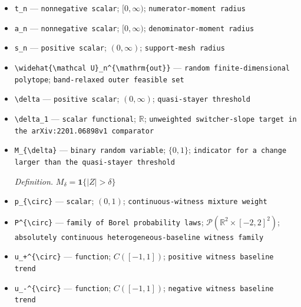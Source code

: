 \documentclass{article}
\begin{document}
\begin{itemize}
  \item \texttt{t\_\allowbreak{}n} --- \texttt{nonnegative scalar}; \([0,\infty)\); \texttt{numerator-\allowbreak{}moment radius}
  \item \texttt{a\_\allowbreak{}n} --- \texttt{nonnegative scalar}; \([0,\infty)\); \texttt{denominator-\allowbreak{}moment radius}
  \item \texttt{s\_\allowbreak{}n} --- \texttt{positive scalar}; \((0,\infty)\); \texttt{support-\allowbreak{}mesh radius}
  \item \texttt{\textbackslash{}\allowbreak{}widehat\{\textbackslash{}\allowbreak{}mathcal U\}\allowbreak{}\_\allowbreak{}n\textasciicircum{}\{\textbackslash{}\allowbreak{}mathrm\{out\}\allowbreak{}\}\allowbreak{}} --- \texttt{random finite-\allowbreak{}dimensional polytope}; \texttt{band-\allowbreak{}relaxed outer feasible set}
  \item \texttt{\textbackslash{}\allowbreak{}delta} --- \texttt{positive scalar}; \((0,\infty)\); \texttt{quasi-\allowbreak{}stayer threshold}
  \item \texttt{\textbackslash{}\allowbreak{}delta\_\allowbreak{}1} --- \texttt{scalar functional}; \(\mathbb R\); \texttt{unweighted switcher-\allowbreak{}slope target in the arXiv:\allowbreak{}2201.06898v1 comparator}
  \item \texttt{M\_\allowbreak{}\{\textbackslash{}\allowbreak{}delta\}\allowbreak{}} --- \texttt{binary random variable}; \(\{0,1\}\); \texttt{indicator for a change larger than the quasi-\allowbreak{}stayer threshold}
  \par\smallskip\noindent\emph{Definition.} \(M_{\delta}=\mathbf 1\{|Z|>\delta\}\)
  \item \texttt{p\_\allowbreak{}\{\textbackslash{}\allowbreak{}circ\}\allowbreak{}} --- \texttt{scalar}; \((0,1)\); \texttt{continuous-\allowbreak{}witness mixture weight}
  \item \texttt{P\textasciicircum{}\{\textbackslash{}\allowbreak{}circ\}\allowbreak{}} --- \texttt{family of Borel probability laws}; \(\mathcal P(\mathbb R^2\times[-2,2]^2)\); \texttt{absolutely continuous heterogeneous-\allowbreak{}baseline witness family}
  \item \texttt{u\_\allowbreak{}+\allowbreak{}\textasciicircum{}\{\textbackslash{}\allowbreak{}circ\}\allowbreak{}} --- \texttt{function}; \(C([-1,1])\); \texttt{positive witness baseline trend}
  \item \texttt{u\_\allowbreak{}-\allowbreak{}\textasciicircum{}\{\textbackslash{}\allowbreak{}circ\}\allowbreak{}} --- \texttt{function}; \(C([-1,1])\); \texttt{negative witness baseline trend}

\end{itemize}
\end{document}
